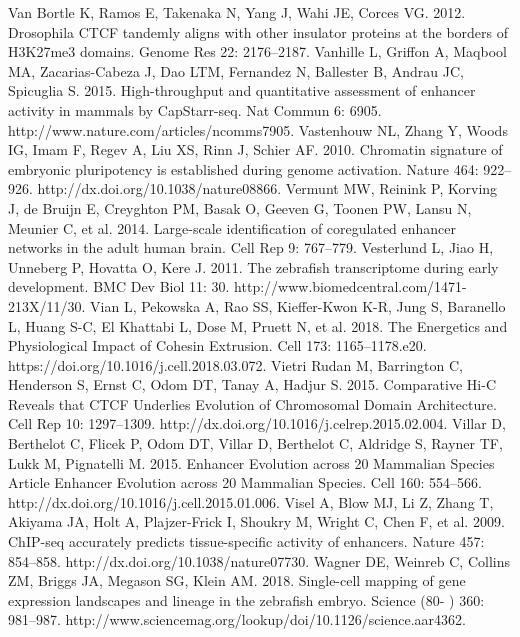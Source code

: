 \begin{thebibliography}{1}
	 Van Bortle K, Ramos E, Takenaka N, Yang J, Wahi JE, Corces VG. 2012. Drosophila CTCF tandemly aligns with other insulator proteins at the borders of H3K27me3 domains. Genome Res 22: 2176–2187.
	 Vanhille L, Griffon A, Maqbool MA, Zacarias-Cabeza J, Dao LTM, Fernandez N, Ballester B, Andrau JC, Spicuglia S. 2015. High-throughput and quantitative assessment of enhancer activity in mammals by CapStarr-seq. Nat Commun 6: 6905. http://www.nature.com/articles/ncomms7905.
	 Vastenhouw NL, Zhang Y, Woods IG, Imam F, Regev A, Liu XS, Rinn J, Schier AF. 2010. Chromatin signature of embryonic pluripotency is established during genome activation. Nature 464: 922–926. http://dx.doi.org/10.1038/nature08866.
	 Vermunt MW, Reinink P, Korving J, de Bruijn E, Creyghton PM, Basak O, Geeven G, Toonen PW, Lansu N, Meunier C, et al. 2014. Large-scale identification of coregulated enhancer networks in the adult human brain. Cell Rep 9: 767–779.
	 Vesterlund L, Jiao H, Unneberg P, Hovatta O, Kere J. 2011. The zebrafish transcriptome during early development. BMC Dev Biol 11: 30. http://www.biomedcentral.com/1471-213X/11/30.
	 Vian L, Pekowska A, Rao SS, Kieffer-Kwon K-R, Jung S, Baranello L, Huang S-C, El Khattabi L, Dose M, Pruett N, et al. 2018. The Energetics and Physiological Impact of Cohesin Extrusion. Cell 173: 1165–1178.e20. https://doi.org/10.1016/j.cell.2018.03.072.
	 Vietri Rudan M, Barrington C, Henderson S, Ernst C, Odom DT, Tanay A, Hadjur S. 2015. Comparative Hi-C Reveals that CTCF Underlies Evolution of Chromosomal Domain Architecture. Cell Rep 10: 1297–1309. http://dx.doi.org/10.1016/j.celrep.2015.02.004.
	 Villar D, Berthelot C, Flicek P, Odom DT, Villar D, Berthelot C, Aldridge S, Rayner TF, Lukk M, Pignatelli M. 2015. Enhancer Evolution across 20 Mammalian Species Article Enhancer Evolution across 20 Mammalian Species. Cell 160: 554–566. http://dx.doi.org/10.1016/j.cell.2015.01.006.
	 Visel A, Blow MJ, Li Z, Zhang T, Akiyama JA, Holt A, Plajzer-Frick I, Shoukry M, Wright C, Chen F, et al. 2009. ChIP-seq accurately predicts tissue-specific activity of enhancers. Nature 457: 854–858. http://dx.doi.org/10.1038/nature07730.
	 Wagner DE, Weinreb C, Collins ZM, Briggs JA, Megason SG, Klein AM. 2018. Single-cell mapping of gene expression landscapes and lineage in the zebrafish embryo. Science (80- ) 360: 981–987. http://www.sciencemag.org/lookup/doi/10.1126/science.aar4362.

\end{thebibliography}
